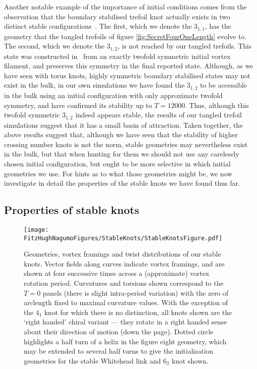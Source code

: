 Another notable example of the importance of initial conditions comes from the observation that the boundary stabilised trefoil knot actually exists in two distinct stable configurations~\citep{Maucher2017}. The first, which we denote the $3_{1,1}$, has the geometry that the tangled trefoils of figure \ref{fig:SecretFourOneLength} evolve to. The second, which we denote the $3_{1,2}$, is not reached by our tangled trefoils. This state was constructed in~\citep{Maucher2017} from an exactly twofold symmetric initial vortex filament, and preserves this symmetry in the final reported state. Although, as we have seen with torus knots, highly symmetric boundary stabilised states may not exist in the bulk, in our own simulations we have found the $3_{1,2}$ to be accessible in the bulk using an initial configuration with only approximate twofold symmetry, and have confirmed its stability up to $T=12000$. Thus, although this twofold symmetric $3_{1,2}$ indeed appears stable, the results of our tangled trefoil simulations suggest that it has a small basin of attraction. Taken together, the above results suggest that, although we have seen that the stability of higher crossing number knots is not the norm, stable geometries may nevertheless exist in the bulk, but that when hunting for them we should not use any carelessly chosen initial configuration, but ought to be more selective in which initial geometries we use. For hints as to what those geometries might be, we now investigate in detail the properties of the stable knots we have found thus far.

\subsection{Properties of stable knots}
\begin{figure}[hbtp]
    \texttt{[image: \\FitzHughNagumoFigures/StableKnots/StableKnotsFigure.pdf]}
    \caption[Characterisation of stable knots.]{Geometries, vortex framings and twist distributions of our stable knots. Vector fields along curves indicate vortex framings, and are shown at four successive times across a (approximate) vortex rotation period. Curvatures and torsions shown correspond to the $T=0$ panels (there is slight intra-period variation) with the zero of arclength fixed to maximal curvature values. With the exception of the $4_1$ knot for which there is no distinction, all knots shown are the `right handed' chiral variant --- they rotate in a right handed sense about their direction of motion (down the page). Dotted circle highlights a half turn of a helix in the figure eight geometry, which may be extended to several half turns to give the initialisation geometries for the stable Whitehead link and $6_2$ knot shown. }
\label{fig:StableKnots}
\end{figure}

